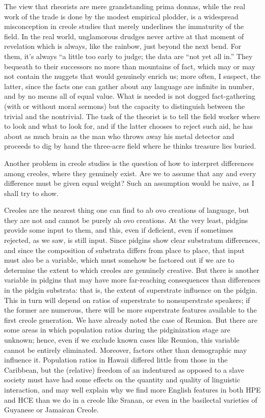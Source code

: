 The view that rheorists are mere grandstanding prima donnas, while the real work of the trade is done by the modest empirical plodder, is a widespread misconception in creole studies that merely underlines the immaturity of the field. In the real world, unglamorous drudges never artive at that moment of revelation which is always, like the rainbow, just beyond the next bend. For them, it's always ``a little too early to judge{\textquotedbl}; the data are ``not yet all in.'' They bequeath to their successors no more than mountains of fact, which may or may not contain the nuggets that would genuinely enrich us; more often, I suspect, the latter, since the facts one can gather about any language are infinite in number, and by no means all of equal value. What is needed is not dogged fact-gathering (with or without moral sermons) but the capacity to distinguish between the trivial and the nontrivial. The task of the theorist is to tell the field worker where to look and what to look for, and if the latter chooses to reject such aid, he has about as much brain as the man who throws away his metal detector and proceeds to dig by hand the three-acre field where he thinks treasure lies buried.

Another problem in creole studies is the question of how to interpret differences among creoles, where they genuinely exist. Are we to assume that any and every difference must be given equal weight? Such an assumption would be naive, as I shall try to show.

Creoles are the nearest thing one can find to ab ovo creations of language, but they are not and cannot be purely ah ovo creations. At the very least, pidgins provide some input to them, and this, even if deficient, even if sometimes rejected, as we saw, is still input. Since pidgins show clear substratum differences, and since the composition of substrata differs from place to place, that input must also be a variable, which must somehow be factored out if we are to determine the extent to which creoles are genuinely creative.
But there is another variable in pidgins that may have more far-reaching consequences than differences in the pidgin substrata: that is, the extent of superstrate influence on the pidgin. This in turn will depend on ratios of superstrate to nonsuperstrate speakers; if the former are numerous, there will be more superstrate features avail\-able to the first creole generation. We have already noted the case of Reunion. But there are some areas in which population ratios during the pidginization stage are unknown; hence, even if we exclude known cases like Reunion, this variable cannot be entirely eliminated. More\-over, factors other than demographic may influence it. Population ratios in Hawaii differed little from those in the Caribbean, but the (relative) freedom of an indentured as opposed to a slave society must have had some effects on the quantity and quality of linguistic inter\-action, and may well explain why we find more English features in both HPE and HCE than we do in a creole like Sranan, or even in the basilectal varieties of Guyanese or Jamaican Creole.

